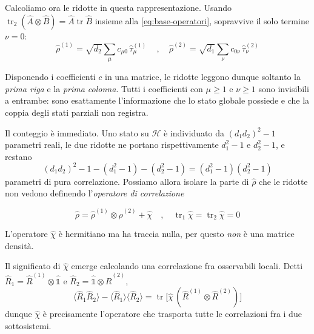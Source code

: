Calcoliamo ora le ridotte in questa rappresentazione. Usando $\operatorname{tr}_2 (\hat{A} \otimes \hat{B}) = \hat{A} \operatorname{tr} \hat{B}$ insieme alla \eqref{eq:base-operatori}, sopravvive il solo termine $\nu = 0$:
%
\begin{equation}
    \hat{\rho}^{(1)} = \sqrt{d_2} \sum_\mu c_{\mu 0} \, \hat{\tau}^{(1)}_\mu \, \quad , \quad \hat{\rho}^{(2)} = \sqrt{d_1} \sum_\nu c_{0 \nu} \, \hat{\tau}^{(2)}_\nu
    \label{eq:ridotte-coefficienti}
\end{equation}

Disponendo i coefficienti $c$ in una matrice, le ridotte leggono dunque soltanto la \emph{prima riga} e la \emph{prima colonna}. Tutti i coefficienti con $\mu \geq 1$ e $\nu \geq 1$ sono invisibili a entrambe: sono esattamente l'informazione che lo stato globale possiede e che la coppia degli stati parziali non registra.

Il conteggio è immediato. Uno stato su $\mathcal{H}$ è individuato da $(d_1 d_2)^2 - 1$ parametri reali, le due ridotte ne portano rispettivamente $d_1^2 - 1$ e $d_2^2 - 1$, e restano
%
\begin{equation}
    (d_1 d_2)^2 - 1 - (d_1^2 - 1) - (d_2^2 - 1) = (d_1^2 - 1)(d_2^2 - 1)
    \label{eq:conteggio-correlazioni}
\end{equation}
%
parametri di pura correlazione. Possiamo allora isolare la parte di $\hat{\rho}$ che le ridotte non vedono definendo l'\emph{operatore di correlazione}
%
\begin{tcolorbox}[colback=black!5!white, colframe=black!45!white, boxrule=0.8pt]
\begin{equation}
    \hat{\rho} = \hat{\rho}^{(1)} \otimes \hat{\rho}^{(2)} + \hat{\chi} \quad , \quad \operatorname{tr}_1 \hat{\chi} = \operatorname{tr}_2 \hat{\chi} = 0
    \label{eq:decomposizione-correlazione}
\end{equation}
\end{tcolorbox}

L'operatore $\hat{\chi}$ è hermitiano ma ha traccia nulla, per questo \emph{non} è una matrice densità. 

Il significato di $\hat{\chi}$ emerge calcolando una correlazione fra osservabili locali. Detti $\hat{R}_1 = \hat{R}^{(1)} \otimes \hat{\mathds{1}}$ e $\hat{R}_2 = \hat{\mathds{1}} \otimes \hat{R}^{(2)}$,
%
\begin{equation}
    \bigl\langle \hat{R}_1 \hat{R}_2 \bigr\rangle - \bigl\langle \hat{R}_1 \bigr\rangle \bigl\langle \hat{R}_2 \bigr\rangle = \operatorname{tr} \bigl[ \hat{\chi} \, ( \hat{R}^{(1)} \otimes \hat{R}^{(2)} ) \bigr]
    \label{eq:correlazione-chi}
\end{equation}
%
dunque $\hat{\chi}$ è precisamente l'operatore che trasporta tutte le correlazioni fra i due sottosistemi.

